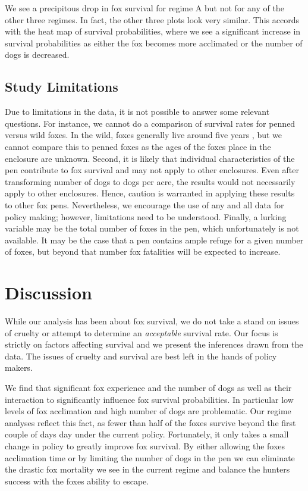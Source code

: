 \documentclass[aoas,preprint]{imsart}
\numberwithin{equation}{section}
\theoremstyle{plain}
\begin{document}
We see a precipitous drop in fox survival for regime A but not for any of the other three regimes. In fact, the other three plots look very similar. This accords with the heat map of survival probabilities, where we see a significant increase in survival probabilities as either the fox becomes more acclimated or the number of dogs is decreased. 

\subsection{Study Limitations}
Due to limitations in the data, it is not possible to answer some relevant questions. For instance, we cannot do a comparison of survival rates for penned versus wild foxes. In the wild, foxes generally live around five years \citep{hunter}, but we cannot compare this to penned foxes as the ages of the foxes place in the enclosure are unknown. Second, it is likely that individual characteristics of the pen contribute to fox survival and may not apply to other enclosures. Even after transforming number of dogs to dogs per acre, the results would not necessarily apply to other enclosures. Hence, caution is warranted in applying these results to other fox pens. Nevertheless, we encourage the use of any and all data for policy making; however, limitations need to be understood. Finally, a lurking variable may be the total number of foxes in the pen, which unfortunately is not available. It may be the case that a pen contains ample refuge for a given number of foxes, but beyond that number fox fatalities will be expected to increase.

\section{Discussion}
While our analysis has been about fox survival, we do not take a stand on issues of cruelty or attempt to determine an \emph{acceptable} survival rate. Our focus is strictly on factors affecting survival and we present the inferences drawn from the data. The issues of cruelty and survival are best left in the hands of policy makers.

We find that significant fox experience and the number of dogs as well as their interaction to significantly influence fox survival probabilities. In particular low levels of fox acclimation and high number of dogs are problematic. Our regime analyses reflect this fact, as fewer than half of the foxes survive beyond the first couple of days day under the current policy. Fortunately, it only takes a small change in policy to greatly improve fox survival. By either allowing the foxes acclimation time or by limiting the number of dogs in the pen we can eliminate the drastic fox mortality we see in the current regime and balance the hunters success with the foxes ability to escape.




%
%
%
\end{document}
